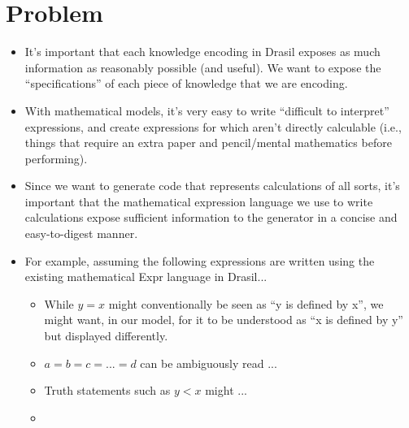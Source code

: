 
\section{Problem}

\begin{itemize}

	\item It's important that each knowledge encoding in Drasil exposes as much
	      information as reasonably possible (and useful).  We want to expose the ``specifications'' of each piece
          of knowledge that we are encoding.

	\item With mathematical models, it's very easy to write ``difficult to
	      interpret'' expressions, and create expressions for which aren't
	      directly calculable (i.e., things that require an extra paper and
	      pencil/mental mathematics before performing).

	\item Since we want to generate code that represents calculations of all
	      sorts, it's important that the mathematical expression language we
	      use to write calculations expose sufficient information to the
	      generator in a concise and easy-to-digest manner.

	\item For example, assuming the following expressions are written using
	      the existing mathematical Expr language in Drasil...
	      \begin{itemize}

		      \item While \(y = x\) might conventionally be seen as ``y is
		            defined by x'', we might want, in our model, for it to be
		            understood as ``x is defined by y'' but displayed differently.

		      \item \(a = b = c = ... = d\) can be ambiguously read ...

		      \item Truth statements such as \(y < x\) might ...

		      \item {}

	      \end{itemize}

\end{itemize}

